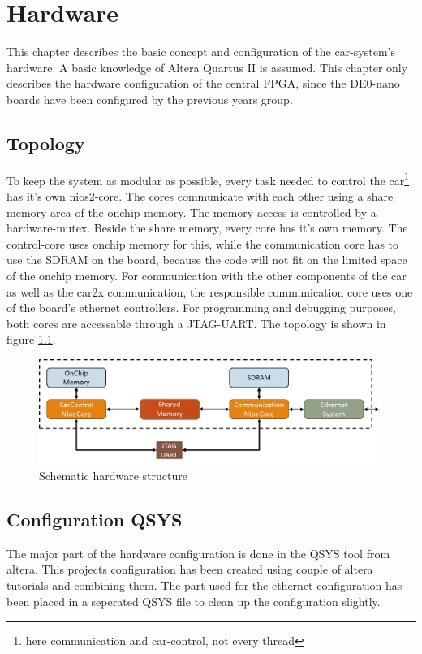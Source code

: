 \chapter{Hardware}
This chapter describes the basic concept and configuration of the car-system's hardware. A basic knowledge of Altera Quartus II is assumed. This chapter only describes the hardware configuration of the central FPGA, since the DE0-nano boards have been configured by the previous years group.
\section{Topology}
To keep the system as modular as possible, every task needed to control the car\footnote{here communication and car-control, not every thread} has it's own nios2-core. The cores communicate with each other using a share memory area of the onchip memory. The memory access is controlled by a hardware-mutex. Beside the share memory, every core has it's own memory. The control-core uses onchip memory for this, while the communication core has to use the SDRAM on the board, because the code will not fit on the limited space of the onchip memory. For communication with the other components of the car as well as the car2x communication, the responsible communication core uses one of the board's ethernet controllers. For programming and debugging purposes, both cores are accessable through a JTAG-UART. The topology is shown in figure \ref{HWtopo}.


\begin{center}
\begin{figure}[h]
	\includegraphics[width=\textwidth]{figures/FPGA_QSYS_Structure.png}
	\caption{Schematic hardware structure} \label{HWtopo}
\end{figure}
\end{center}

\section{Configuration QSYS}
The major part of the hardware configuration is done in the QSYS tool from altera. This projects configuration has been created using couple of altera tutorials and combining them. The part used for the ethernet configuration has been placed in a seperated QSYS file to clean up the configuration slightly. 

